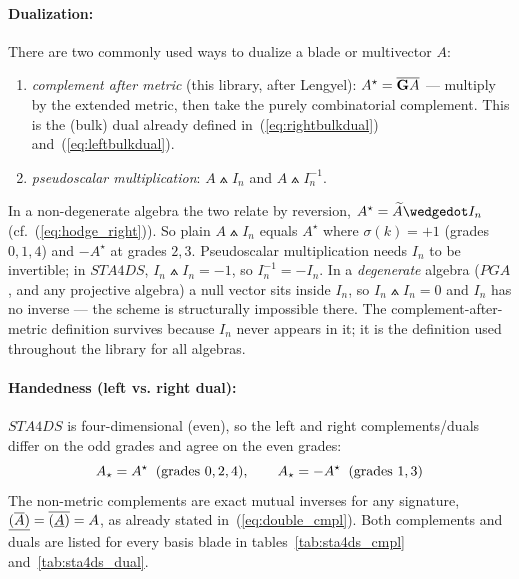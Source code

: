 \paragraph{Dualization:} There are two commonly used ways to dualize a blade or
multivector $A$:
\begin{enumerate}
    \item \emph{complement after metric} (this library, after Lengyel):
    $A^{\star} = \overline{\mathbf{G}A}$ --- multiply by the extended metric, then take the
    purely combinatorial complement. This is the (bulk) dual already defined
    in~(\ref{eq:rightbulkdual}) and~(\ref{eq:leftbulkdual}).
    \item \emph{pseudoscalar multiplication}: $A \wedgedot I_n$ and $A \wedgedot
    I_n^{-1}$.
\end{enumerate}
In a non-degenerate algebra the two relate by reversion, $A^{\star} = \rev{A} \wedgedot
I_n$ (cf.~(\ref{eq:hodge_right})). So plain $A \wedgedot I_n$ equals $A^{\star}$ where
$\sigma(k) = +1$ (grades $0, 1, 4$) and $-A^{\star}$ at grades $2, 3$. Pseudoscalar
multiplication needs $I_n$ to be invertible; in $STA4DS$, $I_n \wedgedot I_n = -1$, so
$I_n^{-1} = -I_n$. In a \emph{degenerate} algebra ($PGA$, and any projective algebra) a
null vector sits inside $I_n$, so $I_n \wedgedot I_n = 0$ and $I_n$ has no inverse --- the
scheme is structurally impossible there. The complement-after-metric definition survives
because $I_n$ never appears in it; it is the definition used throughout the library
for all algebras.

\paragraph{Handedness (left vs. right dual):} $STA4DS$ is four-dimensional (even), so the
left and right complements/duals differ on the
odd grades and agree on the even grades:
\begin{equation}
    {A}_\star = {A}^\star \;\;\text{(grades $0,2,4$)}, \qquad
    {A}_\star = -{A}^\star \;\;\text{(grades $1,3$)}
\end{equation}
The non-metric complements are exact mutual inverses for any signature,
$\underline{(\overline{A})} = \overline{(\underline{A})} = A$, as already stated
in~(\ref{eq:double_cmpl}). Both complements and duals are listed for every basis blade in
tables~\ref{tab:sta4ds_cmpl} and~\ref{tab:sta4ds_dual}.

